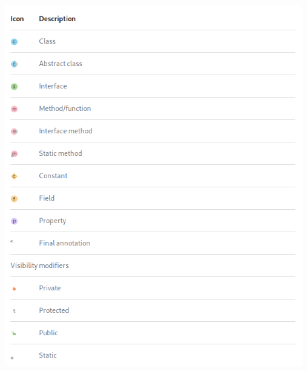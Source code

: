 \documentclass[12pt]{article}
\begin{document}
\includegraphics[width=13cm]{icons_legend.png}
\end{document}
